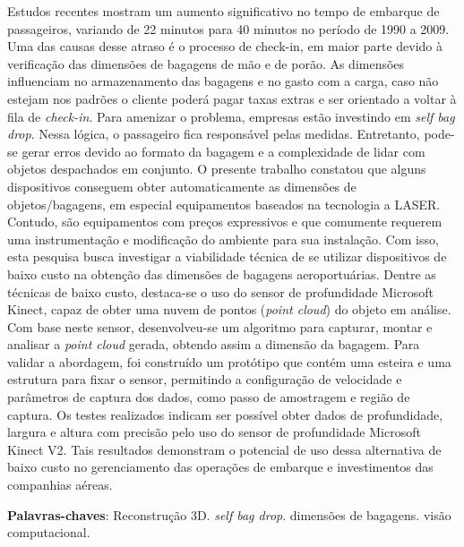 \begin{resumo}
Estudos recentes mostram um aumento significativo no tempo de embarque de passageiros, variando de 22 minutos para 40 minutos no período de 1990 a 2009. Uma das causas desse atraso é o processo de check-in, em maior parte devido à verificação das dimensões de bagagens de mão e de porão. As dimensões influenciam no armazenamento das bagagens e no gasto com a carga, caso não estejam nos padrões o cliente poderá pagar taxas extras e ser orientado a voltar à fila de \textit{check-in}. 
Para amenizar o problema, empresas estão investindo em \textit{self bag drop}. Nessa lógica, o passageiro fica responsável pelas medidas. Entretanto, pode-se gerar erros devido ao formato da bagagem e a complexidade de lidar com objetos despachados em conjunto. O presente trabalho constatou que alguns dispositivos conseguem obter automaticamente as dimensões de objetos/bagagens, em especial equipamentos baseados na tecnologia a LASER. Contudo, são equipamentos com preços expressivos e que comumente requerem uma instrumentação e modificação do ambiente para sua instalação. Com isso, esta pesquisa busca investigar a viabilidade técnica de se utilizar dispositivos de baixo custo na obtenção das dimensões de bagagens aeroportuárias.
Dentre as técnicas de baixo custo, destaca-se o uso do sensor de profundidade Microsoft Kinect, capaz de obter uma nuvem de pontos (\textit{point cloud}) do objeto em análise. Com base neste sensor, desenvolveu-se um algoritmo para capturar, montar e analisar a \textit{point cloud} gerada, obtendo assim a dimensão da bagagem. 
Para validar a abordagem, foi construído um protótipo que contém uma esteira e uma estrutura para fixar o sensor, permitindo a configuração de velocidade e parâmetros de captura dos dados, como passo de amostragem e região de captura. 
Os testes realizados indicam ser possível obter dados de profundidade, largura e altura com precisão pelo uso do sensor de profundidade Microsoft Kinect V2. Tais resultados demonstram o potencial de uso dessa alternativa de baixo custo no gerenciamento das operações de embarque e investimentos das companhias aéreas.


    \vspace{\onelineskip}
    \noindent
    \textbf{Palavras-chaves}: Reconstrução 3D. \textit{self bag drop}. dimensões de bagagens. visão computacional.
\end{resumo}



